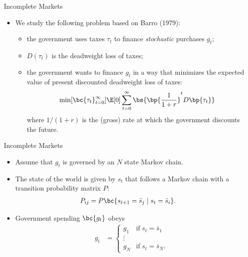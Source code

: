 \documentclass[11pt,xcolor={dvipsnames},hyperref={pdftex,pdfpagemode=UseNone,hidelinks,pdfdisplaydoctitle=true},usepdftitle=false]{beamer}
\begin{document}
    \begin{frame}{Incomplete Markets}
    \begin{itemize}
    \item We study the following problem based on Barro (1979):
    \begin{itemize}
    \item the government uses taxes $\tau_{t}$ to finance \emph{stochastic}
    purchases $g_{t}$;
    \item  $D\left(\tau_{t}\right)$  is the deadweight loss of taxes;
    \item the government wants to finance $g_{t}$ in a way that minimizes the
    expected value of present discounted deadweight loss of taxes: 
    \[
    \min[\bc{\tau_t}_{t=0}^\infty] \E[0] \sum_{t=0}^\infty \bs{\bp{\frac{1}{1+r}}^t D\bp{\tau_t}}
    \]
    where $1/\left(1+r\right)$ is the (gross) rate at which the government
    discounts the future.
    \end{itemize}
    \end{itemize}
    \end{frame}
    \begin{frame}{Incomplete Markets}
    \begin{itemize}
    \item Assume that $g_{t}$ is governed by an $N$ state Markov chain.
    \item The state of the world is given by $s_{t}$ that follows a Markov
    chain with a transition probability matrix $P$: 
    \begin{align*}
    P_{ij} & =P\bc{s_{t+1}=\bar{s}_{j}\mid s_{t}=\bar{s}_{i}}. 
    \end{align*}
    \item Government spending $\bc{g_t}$ obeys 
    \begin{align*}
    g_{t} & =\begin{cases}
    g_{1} & \text{if}\;s_{t}=\bar{s}_{1}\\
    \vdots\\
    g_{N} & \text{if}\;s_{t}=\bar{s}_{N}.
    \end{cases}
    \end{align*}
    \end{itemize}
    \end{frame}
    
\end{document}

